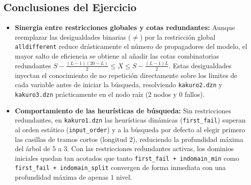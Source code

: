\subsection{Conclusiones del Ejercicio}
\begin{itemize}
    \item \textbf{Sinergia entre restricciones globales y cotas redundantes:} Aunque reemplazar las desigualdades binarias ($\neq$) por la restricción global \texttt{alldifferent} reduce drásticamente el número de propagadores del modelo, el mayor salto de eficiencia se obtiene al añadir las cotas combinatorias redundantes $S - \frac{(L-1)(20-L)}{2} \le X \le S - \frac{(L-1)L}{2}$. Estas desigualdades inyectan el conocimiento de no repetición directamente sobre los límites de cada variable antes de iniciar la búsqueda, resolviendo \texttt{kakuro2.dzn} y \texttt{kakuro3.dzn} prácticamente en el nodo raíz ($2$ nodos y $0$ fallos).
    \item \textbf{Comportamiento de las heurísticas de búsqueda:} Sin restricciones redundantes, en \texttt{kakuro1.dzn} las heurísticas dinámicas (\texttt{first\_fail}) superan al orden estático (\texttt{input\_order}) y a la búsqueda por defecto al elegir primero las casillas de tramos cortos (longitud $2$), reduciendo la profundidad máxima del árbol de $5$ a $3$. Con las restricciones redundantes activas, los dominios iniciales quedan tan acotados que tanto \texttt{first\_fail + indomain\_min} como \texttt{first\_fail + indomain\_split} convergen de forma inmediata con una profundidad máxima de apenas $1$ nivel.
\end{itemize}
